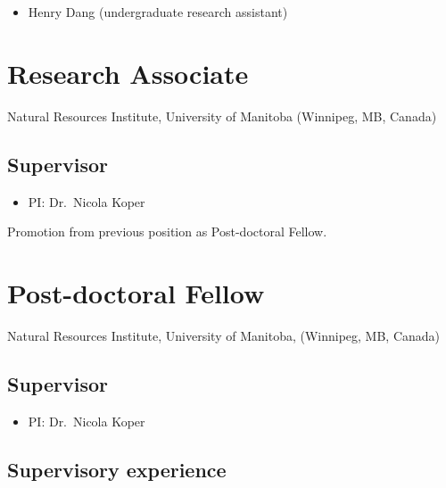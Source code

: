 \documentclass[
  letterpaper,
  DIV=11,
  numbers=noendperiod,
  oneside]{scrreprt}
\providecommand{\tightlist}{%
  \setlength{\itemsep}{0pt}\setlength{\parskip}{0pt}}\usepackage{longtable,booktabs,array}
\begin{document}
\begin{itemize}
\tightlist
\item
  Henry Dang (undergraduate research assistant)
\end{itemize}

\section{Research Associate}\label{research-associate}

Natural Resources Institute, University of Manitoba (Winnipeg, MB,
Canada)


\subsection{Supervisor}\label{supervisor}

\begin{itemize}
\tightlist
\item
  PI: Dr.~Nicola Koper
\end{itemize}

Promotion from previous position as Post-doctoral Fellow.

\section{Post-doctoral Fellow}\label{post-doctoral-fellow}

Natural Resources Institute, University of Manitoba, (Winnipeg, MB,
Canada)


\subsection{Supervisor}\label{supervisor-1}

\begin{itemize}
\tightlist
\item
  PI: Dr.~Nicola Koper
\end{itemize}

\subsection{Supervisory experience}\label{supervisory-experience-2}
\end{document}

